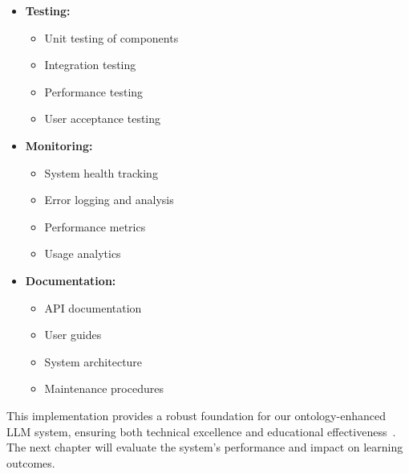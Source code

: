 \begin{itemize}
  \item \textbf{Testing:}
    \begin{itemize}
      \item Unit testing of components
      \item Integration testing
      \item Performance testing
      \item User acceptance testing
    \end{itemize}
  
  \item \textbf{Monitoring:}
    \begin{itemize}
      \item System health tracking
      \item Error logging and analysis
      \item Performance metrics
      \item Usage analytics
    \end{itemize}
  
  \item \textbf{Documentation:}
    \begin{itemize}
      \item API documentation
      \item User guides
      \item System architecture
      \item Maintenance procedures
    \end{itemize}
\end{itemize}

This implementation provides a robust foundation for our ontology-enhanced LLM system, ensuring both technical excellence and educational effectiveness~\cite{liu2024ontology}. The next chapter will evaluate the system's performance and impact on learning outcomes. 